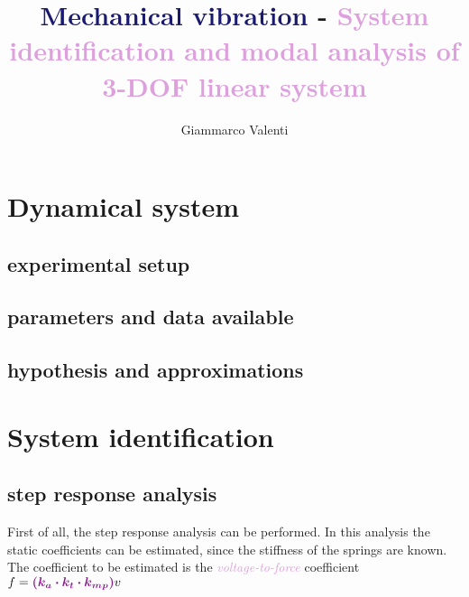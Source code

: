 \documentclass[twosided,a4paper]{article}           %
\begin{document}
	
	\title{\textcolor{MidnightBlue}{Mechanical vibration} - \textcolor{Plum}{System identification and modal analysis of 3-DOF linear system}}
	\author{Giammarco Valenti}
	\maketitle
	
\section{Dynamical system}

\subsection{experimental setup}

\subsection{parameters and data available}

\subsection{hypothesis and approximations}

\section{System identification}
	
\subsection{step response analysis}

First of all, the step response analysis can be performed. In this analysis the static coefficients can be estimated, since the stiffness of the springs are known.
The coefficient to be estimated is the \textcolor{Plum}{\textit{voltage-to-force}} coefficient $f = \textcolor{Plum}{\bm{(k_a\cdot k_t \cdot k_{mp})}}v$ %
\end{document}
